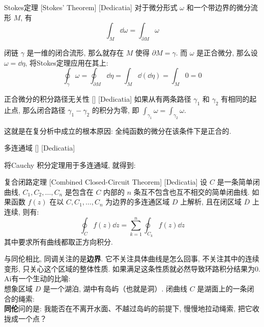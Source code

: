 \documentclass[UTF8]{ctexart}
\begin{document}
        \begin{thm}
            [UUID]
            {Stokes定理}
            [Stokes' Theorem]
            [Dedicatia]
            对于微分形式 \(\omega\) 和一个带边界的微分流形 \(M\), 有
            \[\int_{M} \dd\omega = \int_{\partial M} \omega\]
        \end{thm}

        闭链 \(\gamma\) 是一维的闭合流形, 那么就存在 \(M\) 使得 \(\partial M=\gamma\). 而 \(\omega\) 是正合微分, 那么设 \(\omega=\dd{\eta}\), 将Stokes定理应用在其上: 
        \[\oint_{\gamma} \omega = \oint_{\partial M} \dd\eta = \int_{M} \dd(\dd\eta) = \int_{M} 0 = 0\]
        
        \begin{ppt}
            [UUID]
            {正合微分的积分路径无关性}
            []
            [Dedicatia]
            如果从有两条路径  \(\gamma_1\)  和  \(\gamma_2\) 有相同的起止点, 那么闭合路径  \(\gamma_1 - \gamma_2\)  的积分为零, 即  \(\int_{\gamma_1} \omega = \int_{\gamma_2} \omega\). 
        \end{ppt}

        这就是\CauchyThm 在复分析中成立的根本原因: 全纯函数的微分在该条件下是正合的. 

        \begin{dfn}
            [UUID]
            {多连通域}
            []
            [Dedicatia]
        \end{dfn}

        将Cauchy 积分定理用于多连通域, 就得到: 

        \begin{thm}
            [CombinedClosedCircuit]
            {复合闭路定理}
            [Combined Closed-Circuit Theorem]
            [Dedicatia]
            设  \(C\)  是一条简单闭曲线,  \(C_1, C_2, \ldots, C_n\)  是包含在  \(C\)  内部的  \(n\)  条互不包含也互不相交的简单闭曲线. 如果函数  \(f(z)\)  在以  \(C, C_1, \ldots, C_n\)  为边界的多连通区域 \(D\) 上解析, 且在闭区域  \(\overline{D}\)  上连续, 则有: 
            \[\oint_C f(z) \dd z = \sum_{k=1}^n \oint_{C_k} f(z) \dd z\]
            其中要求所有曲线都取正方向积分. 
        \end{thm}

        与同伦相比, 同调关注的是\textbf{边界}. 它不关注具体曲线是怎么回事, 不关注其中的连续变形, 只关心这个区域的整体性质. 如果满足这条性质就必然导致环路积分结果为0.\\
        Ai有一个生动的比喻:\\
        想象区域  \(D\)  是一个湖泊, 湖中有岛屿（也就是洞）. 闭曲线  \(C\)  是湖面上的一条闭合的绳索:\\
        \textbf{同伦}问的是: 我能否在不离开水面、不越过岛屿的前提下, 慢慢地拉动绳索, 把它收拢成一个点？
\end{document}
